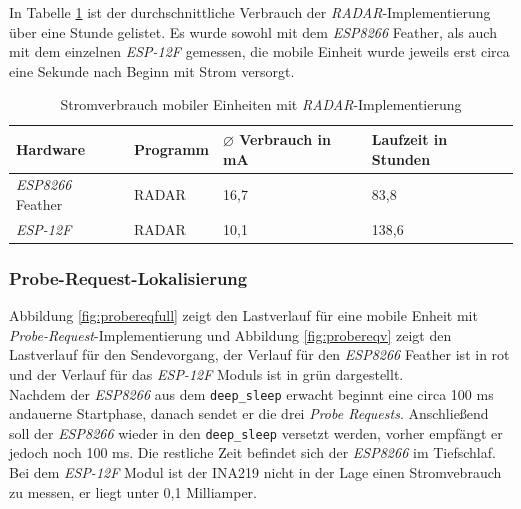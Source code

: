 In Tabelle \ref{table:radarina} ist der durchschnittliche Verbrauch der \emph{RADAR}-Implementierung über eine Stunde gelistet.
Es wurde sowohl mit dem \emph{ESP8266} Feather, als auch mit dem einzelnen \emph{ESP-12F} gemessen, die mobile Einheit wurde jeweils erst circa eine Sekunde nach Beginn mit Strom versorgt.

\begin{table}[h!]
	\centering
	\caption{Stromverbrauch mobiler Einheiten mit \emph{RADAR}-Implementierung}
	\label{table:radarina}
	\begin{tabular}{l|l|p{2.5cm}|p{2.5cm}}
		Hardware & Programm & $\varnothing$ Verbrauch in mA & Laufzeit in Stunden\\
		\hline
		\emph{ESP8266} Feather & RADAR & 16,7 & 83,8\\
		\emph{ESP-12F} & RADAR & 10,1 & 138,6\\
	\end{tabular}
\end{table}

\subsubsection{Probe-Request-Lokalisierung}
\label{ch:phase2:sec:powerprobereq}
Abbildung \ref{fig:probereqfull} zeigt den Lastverlauf für eine mobile Enheit mit \emph{Probe-Request}-Implementierung und Abbildung \ref{fig:probereqv} zeigt den Lastverlauf für den Sendevorgang, der Verlauf für den \emph{ESP8266} Feather ist in rot und der Verlauf für das \emph{ESP-12F} Moduls ist in grün dargestellt.\\
Nachdem der \emph{ESP8266} aus dem \texttt{deep\_sleep} erwacht beginnt eine circa 100 ms andauerne Startphase, danach sendet er die drei \emph{Probe Requests}.
Anschließend soll der \emph{ESP8266} wieder in den \texttt{deep\_sleep} versetzt werden, vorher empfängt er jedoch noch 100 ms.
Die restliche Zeit befindet sich der \emph{ESP8266} im Tiefschlaf. 
Bei dem \emph{ESP-12F} Modul ist der INA219 nicht in der Lage einen Stromvebrauch zu messen, er liegt unter 0,1 Milliamper.\\


